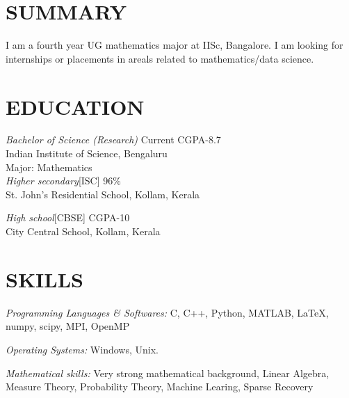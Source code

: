\documentclass[margin, 10pt]{res} %
\begin{document}
\begin{resume}

 
\section{SUMMARY}  

I am a fourth year UG mathematics major at IISc, Bangalore. I am looking for internships or placements in areals related to
mathematics/data science.


\section{EDUCATION}
{\sl Bachelor of Science (Research)} \hfill Current CGPA-8.7\\
Indian Institute of Science, Bengaluru\\
Major: Mathematics\\

{\sl Higher secondary}[ISC]  \hfill  96\%\\
St. John's Residential School, Kollam, Kerala

{\sl High school}[CBSE] \hfill CGPA-10\\
City Central School, Kollam, Kerala 


\section{SKILLS} 

{\sl Programming Languages \& Softwares:} 
C, C++, Python, MATLAB, \LaTeX, numpy, scipy, MPI, OpenMP 

{\sl Operating Systems:} Windows, Unix.

{\sl Mathematical skills:} Very strong mathematical background, Linear Algebra,
Measure Theory, Probability Theory, Machine Learing, Sparse Recovery


\end{resume}
\end{document}
